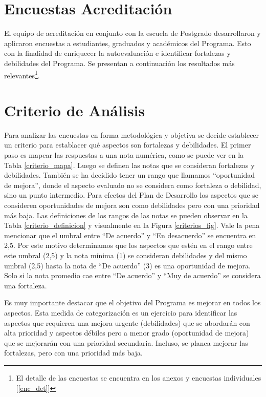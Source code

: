 \section{Encuestas Acreditación}
\label{encuestas}

El equipo de acreditación en conjunto con la escuela de Postgrado desarrollaron y aplicaron
encuestas a estudiantes, graduados y académicos del Programa. Esto con la finalidad de enriquecer
la autoevaluación e identificar fortalezas y debilidades del Programa. Se presentan a continuación
los resultados más relevantes\footnote{El detalle de las encuestas se encuentra en los anexos y encuestas individuales [\ref{enc_det}]}.

\section{Criterio de Análisis}
\label{criterio_analisis}

Para analizar las encuestas en forma metodológica y objetiva se decide establecer un criterio para
establacer qué aspectos son fortalezas y debilidades. El primer paso es mapear las respuestas a una nota numérica,
como se puede ver en la Tabla \ref{criterio_mapa}. Luego se definen las notas que se consideran fortalezas y debilidades. 
También se ha decidido tener un rango que llamamos ``oportunidad de mejora'', donde el aspecto evaluado 
no se considera como fortaleza o debilidad, sino un punto intermedio. Para efectos del Plan de Desarrollo los aspectos 
que se consideren oportunidades de mejora son como debilidades pero con una prioridad más baja. Las definiciones
de los rangos de las notas se pueden observar en la Tabla \ref{criterio_definicion} y visualmente 
en la Figura \ref{criterios_fig}. Vale la pena mencionar 
que el umbral entre ``De acuerdo'' y ``En desacuerdo'' se encuentra en 2,5. Por este motivo determinamos que los aspectos
que estén en el rango entre 
este umbral (2,5) y la nota mínima (1) se consideran debilidades y del mismo umbral (2,5) hasta la nota 
de ``De acuerdo'' (3) es una oportunidad de mejora. Solo si la nota promedio cae entre ``De acuerdo'' y
``Muy de acuerdo'' se considera una fortaleza. 

\begin{remark} 
Es muy importante destacar que el objetivo del Programa es mejorar en todos los aspectos. Esta medida de categorización es un ejercicio 
para identificar las aspectos que requieren una mejora urgente (debilidades) que se abordarán con alta prioridad y aspectos débiles pero a menor grado (oportunidad de mejora) que se mejorarán con una prioridad secundaria. Incluso, se planea mejorar las fortalezas, pero con una prioridad más baja.
\end{remark}


